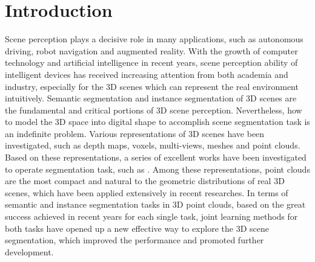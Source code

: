 \documentclass{cta-author}
\begin{document}
\section{Introduction}\label{sec1}
Scene perception plays a decisive role in many applications, such as autonomous driving, robot navigation and augmented reality. With the growth of computer technology and artificial intelligence in recent years, scene perception ability of intelligent devices has received increasing attention from both academia and industry, especially for the 3D scenes which can represent the real environment intuitively. Semantic segmentation and instance segmentation of 3D scenes are the fundamental and critical portions of 3D scene perception.
Nevertheless, how to model the 3D space into digital shape to accomplish scene segmentation task is an indefinite problem.
Various representations of 3D scenes have been investigated, such as depth maps, voxels, multi-views, meshes and point clouds.
Based on these representations, a series of excellent works have been investigated to operate segmentation task,
such as \cite{wang2019voxsegnet,dai20183dmv,qi2017pointnet,qi2017pointnet++,engelmann2017exploring,graham20183d,shen2018mining,huang2018recurrent,Xiaoqing20183D,yi2019gspn,yang2019learning,lahoud20193d,liu2019masc,wang2018sgpn,wang2019associatively,pham2019jsis3d,liang20193d,hou20193d}. Among these representations, point clouds are the most compact and natural to the geometric distributions of real 3D scenes, which have been applied extensively in recent researches. 
In terms of semantic and instance segmentation tasks in 3D point clouds, based on the great success achieved in recent years \cite{Landrieu2018Large,wang2019voxsegnet,graham20183d,wang2019graph,dai20183dmv,engelmann2017exploring,Xiaoqing20183D,wang2018sgpn,yi2019gspn,yang2019learning,lahoud20193d,liu2019masc,elich20193d} for each single task, joint learning methods for both tasks \cite{wang2018sgpn,pham2019jsis3d, wang2019associatively} have opened up a new effective way to explore the 3D scene segmentation, which improved the performance and promoted further development.
\end{document}
